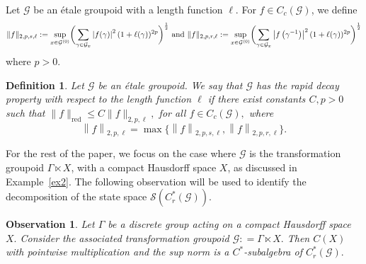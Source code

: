 \documentclass[a4paper,11pt,reqno]{amsart}
\theoremstyle{plain}
\newtheorem{defn}[thm]{Definition}
\newtheorem{observation}[equation]{Observation}
\theoremstyle{named}
\numberwithin{equation}{section}
\newcommand{\hnorm}[1]{\left\lVert#1\right\rVert}
\begin{document}
			Let \(\mathcal{G}\) be an {\'e}tale groupoid with a length function \(\ell\). For \(f\in C_c(\mathcal{G})\), we define
			\[
			 	\|f\|_{2,p,s,\ell} := \sup\limits_{x \in \mathcal G^{(0)}} \biggl (\sum\limits_{\gamma \in \mathcal G_x} \left \lvert f(\gamma) \right \rvert^2 (1 + \ell (\gamma))^{2 p} \biggr )^{\frac {1} {2}} \textup{ and } \|f\|_{2,p,r, \ell} : = \sup\limits_{x \in \mathcal G^{(0)}} \biggl (\sum\limits_{\gamma \in \mathcal G_x} \left \lvert f \left (\gamma^{-1} \right ) \right \rvert^2 (1 + \ell (\gamma))^{2 p} \biggr )^{\frac {1} {2}}
			\]
			where \(p>0\). 
			\begin{defn}
				Let $\mathcal G$ be an étale groupoid. We say that $\mathcal G$ has the rapid decay property with respect to the length function \(\ell\) if there exist constants $C, p > 0$ such that
				$\|f\|_{\mathrm {red}} \leq C \|f\|_{2, p, \ell},$
				for all $f \in C_c (\mathcal G),$ where
				\[
				\hnorm{f}_{2,p,\ell} = \max \{ \hnorm{f}_{2,p,s,\ell}, \hnorm{f}_{2,p,r,\ell}\}.
				\]
			\end{defn}


			For the rest of the paper, we focus on the case where \(\mathcal{G}\) is the transformation groupoid \(\Gamma \ltimes X\), with a compact Hausdorff space \(X\), as discussed in Example~\ref{ex2}. The following observation will be used to identify the decomposition of the state space \(\mathcal{S}(C^{\ast}_{r}(\mathcal{G}))\).
			 
			 \begin{observation}\label{lem3}
			 	Let $\Gamma$ be a discrete group acting on a compact Hausdorff space $X.$ Consider the associated transformation groupoid $\mathcal G : = \Gamma \ltimes X.$  Then $C(X)$ with pointwise multiplication and the sup norm is a $C^{\ast}$-subalgebra of $C_r^{\ast} (\mathcal G).$
			 \end{observation}
			
\end{document}
